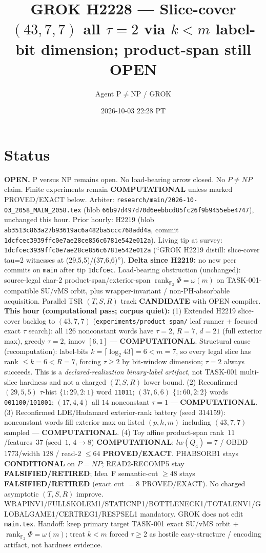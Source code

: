 \documentclass[11pt]{article}
\title{GROK H2228 --- Slice-cover $(43,7,7)$ all $\tau{=}2$ via $k{<}m$ label-bit dimension; product-span still OPEN}
\author{Agent P$\neq$NP / GROK}
\date{2026-10-03 22:28 PT}
\begin{document}
\maketitle

\section*{Status}
\textbf{OPEN.} P versus NP remains open. No load-bearing arrow closed. No $P\neq NP$ claim.
Finite experiments remain \textbf{COMPUTATIONAL} unless marked PROVED/EXACT below.
Arbiter: \texttt{research/main/2026-10-03\_2058\_MAIN\_2058.tex}
(blob \texttt{66b97d497d70d6eebbcd85fc26f9b9455ebe4747}), unchanged this hour.
Prior hourly: H2219 (blob \texttt{ab3513c863a27b93619ac6a482ba5ccc768add4a}, commit \texttt{1dcfcec3939ffc0e7ae28ce856c6781e542e012a}).
Living tip at survey: \texttt{1dcfcec3939ffc0e7ae28ce856c6781e542e012a}
(``GROK H2219 distill: slice-cover tau=2 witnesses at (29,5,5)/(37,6,6)'').
\textbf{Delta since H2219:} no new peer commits on \texttt{main} after tip \texttt{1dcfcec}.
Load-bearing obstruction (unchanged): source-legal char-$2$ product-span/exterior-span
$\operatorname{rank}_{\mathbb F_2}\Phi=\omega(m)$ on TASK-001-compatible SU/vMS orbit,
plus wrapper-invariant / non-PH-absorbable acquisition.
Parallel TSR $(T,S,R)$ track \textbf{CANDIDATE} with OPEN compiler.
\textbf{This hour (computational pass; corpus quiet):}
(1) Extended H2219 slice-cover backlog to $(43,7,7)$
(\texttt{experiments/product\_span/} leaf runner + focused exact $\tau$ search):
all $126$ nonconstant words have $\tau{=}2$, $R{=}7$, $d{=}21$ (full exterior max),
greedy $\tau{=}2$, innov $[6,1]$ --- \textbf{COMPUTATIONAL}.
Structural cause (recomputation): label-bits $k=\lceil\log_2 43\rceil=6<m=7$, so every
legal slice has rank $\le k=6<R=7$, forcing $\tau\ge 2$ by bit-window dimension;
$\tau{=}2$ always succeeds. This is a \emph{declared-realization binary-label artifact},
not TASK-001 multi-slice hardness and not a charged $(T,S,R)$ lower bound.
(2) Reconfirmed $(29,5,5)$ $\tau$-hist $\{1{:}29,2{:}1\}$ word \texttt{11011};
$(37,6,6)$ $\{1{:}60,2{:}2\}$ words \texttt{001100}/\texttt{101001};
$(17,4,4)$ all $14$ nonconstant $\tau{=}1$ --- \textbf{COMPUTATIONAL}.
(3) Reconfirmed LDE/Hadamard exterior-rank battery (seed~$314159$): nonconstant words fill
exterior max on listed $(p,h,m)$ including $(43,7,7)$ sampled --- \textbf{COMPUTATIONAL}.
(4) Toy affine product-span rank~$11$/features~$37$ (seed~$1$, $4\to8$)
\textbf{COMPUTATIONAL}; $lw(Q_4)=7$ / OBDD $1773$/width $128$ / read-$2$ $\le64$
\textbf{PROVED/EXACT}.
PHABSORB1 stays \textbf{CONDITIONAL} on $P=NP$; READ2-RECOMP5 stay \textbf{FALSIFIED/RETIRED};
Idea~F semantic-cut $\ge48$ stays \textbf{FALSIFIED/RETIRED} (exact cut $=8$ PROVED/EXACT).
No charged asymptotic $(T,S,R)$ improve.
WRAPINV1/FULLSKOLEM1/STATICNP1/BOTTLENECK1/TOTALENV1/GLOBALGAME1/CERTREG1/RESPSEL1 mandatory.
GROK does not edit \texttt{main.tex}.
Handoff: keep primary target TASK-001 exact SU/vMS orbit + $\operatorname{rank}_{\mathbb F_2}\Phi=\omega(m)$;
treat $k<m$ forced $\tau\ge 2$ as hostile easy-structure / encoding artifact, not hardness evidence.
\end{document}
